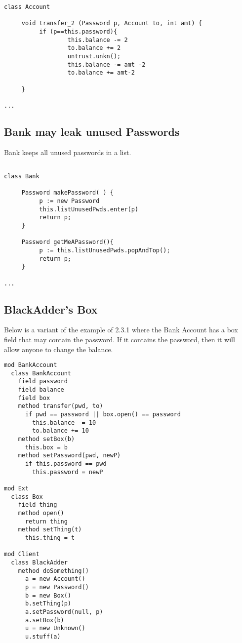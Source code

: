 \begin{lstlisting}[language=chainmail, mathescape=true, frame=lines]
class Account

     void transfer_2 (Password p, Account to, int amt) {
          if (p==this.password){
                  this.balance -= 2
                  to.balance += 2
                  untrust.unkn();
                  this.balance -= amt -2
                  to.balance += amt-2
                     
     }
     
...
\end{lstlisting}

\subsection{Bank may leak unused Passwords}
\label{s:deactivate_leak_old}

Bank keeps all unused passwords in a list. 

\begin{lstlisting}[language=chainmail, mathescape=true, frame=lines]

class Bank

     Password makePassword( ) {
          p := new Password
          this.listUnusedPwds.enter(p) 
          return p;                    
     }
     
     Password getMeAPassword(){
          p := this.listUnusedPwds.popAndTop();
          return p;
     }
     
...
\end{lstlisting}

\subsection{BlackAdder's Box}
\label{s:blackadder_box}

Below is a variant of the example of 2.3.1 where the Bank Account has a box field 
that may contain the password. If it contains the password, then it will allow anyone to change the balance.

\begin{lstlisting}[language=chainmail, mathescape=true, frame=lines]
mod BankAccount
  class BankAccount
    field password
    field balance
    field box
    method transfer(pwd, to)
      if pwd == password || box.open() == password
        this.balance -= 10
        to.balance += 10
    method setBox(b)
      this.box = b
    method setPassword(pwd, newP)
      if this.password == pwd
        this.password = newP
      
mod Ext
  class Box
    field thing
    method open()
      return thing
    method setThing(t)
      this.thing = t
    
mod Client
  class BlackAdder
    method doSomething()
      a = new Account()
      p = new Password()
      b = new Box()
      b.setThing(p)
      a.setPassword(null, p)
      a.setBox(b)
      u = new Unknown()
      u.stuff(a)
\end{lstlisting}

